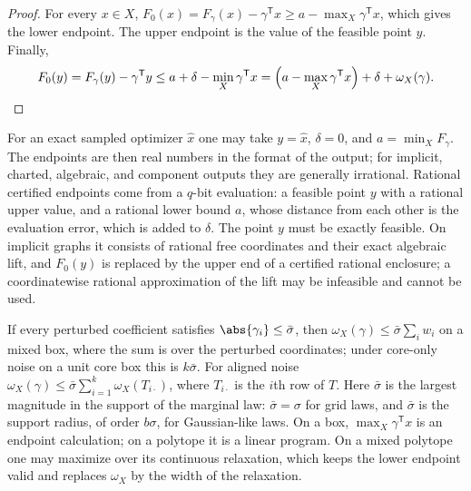 \begin{proof}
For every $x\in X$, $F_0(x)=F_\gamma(x)-\gamma^{\mathsf T}x\ge
a-\max_X\gamma^{\mathsf T}x$, which gives the lower endpoint. The upper
endpoint is the value of the feasible point $y$. Finally,
\[
 F_0(y)=F_\gamma(y)-\gamma^{\mathsf T}y\le a+\delta-\min_X\gamma^{\mathsf T}x
 =\Bigl(a-\max_X\gamma^{\mathsf T}x\Bigr)+\delta+\omega_X(\gamma).\qedhere
\]
\end{proof}

For an exact sampled optimizer $\hat x$ one may take $y=\hat x$, $\delta=0$,
and $a=\min_XF_\gamma$. The endpoints are then real numbers in the format of
the output; for implicit, charted, algebraic, and component outputs they
are generally irrational. Rational certified endpoints come from a
$q$-bit evaluation: a feasible point $y$ with a rational upper value, and a
rational lower bound $a$, whose distance from each other is the evaluation
error, which is added to $\delta$. The point $y$ must be exactly feasible.
On implicit graphs it consists of rational free coordinates and their exact
algebraic lift, and $F_0(y)$ is replaced by the upper end of a certified
rational enclosure; a coordinatewise rational approximation of the lift may
be infeasible and cannot be used.

If every perturbed coefficient satisfies $\abs{\gamma_i}\le\bar\sigma$, then
$\omega_X(\gamma)\le\bar\sigma\sum_iw_i$ on a mixed box, where the sum is
over the perturbed coordinates; under core-only noise on a unit core box this
is $k\bar\sigma$. For aligned noise $\omega_X(\gamma)\le\bar\sigma
\sum_{i=1}^k\omega_X(T_{i\cdot})$, where $T_{i\cdot}$ is the $i$th row of
$T$. Here $\bar\sigma$ is the largest magnitude in the support of the
marginal law: $\bar\sigma=\sigma$ for grid laws, and $\bar\sigma$ is the
support radius, of order $b\sigma$, for Gaussian-like laws. On a box,
$\max_X\gamma^{\mathsf T}x$ is an endpoint calculation; on a polytope it is a
linear program. On a mixed polytope one may maximize over its continuous
relaxation, which keeps the lower endpoint valid and replaces $\omega_X$ by
the width of the relaxation.

